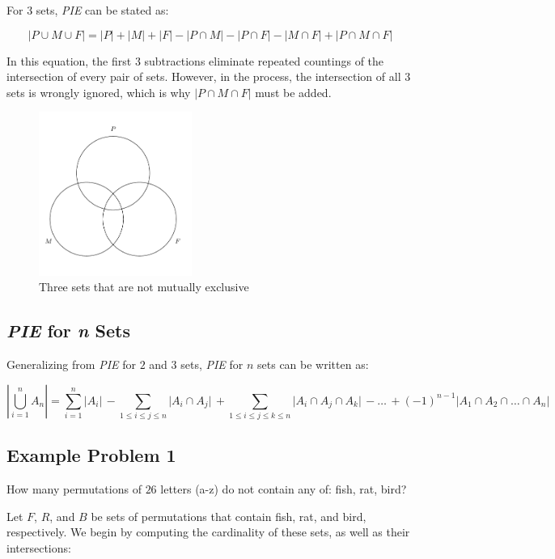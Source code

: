 \documentclass{article}
\begin{document}
For $3$ sets, \textit{PIE} can be stated as:

$$ |P \cup M \cup F| = |P| + |M| + |F| - 
|P \cap M| - |P \cap F| - |M \cap F| 
+ |P \cap M \cap F| $$

In this equation, the first $3$ subtractions eliminate 
repeated countings of the intersection of every pair of sets. 
However, in the process, the intersection of 
all $3$ sets is wrongly ignored, which 
is why $|P \cap M \cap F|$ must be added.

\begin{figure}[h]
\centering
\includegraphics[width=5cm]{VennDiagram3}
\caption{Three sets that are not mutually exclusive}
\end{figure}

\subsection{\textit{PIE} for \textit{n} Sets}

Generalizing from \textit{PIE} for $2$ and $3$ sets, \textit{PIE} for $n$ sets can be written as:

$$
\left\lvert \bigcup_{i=1}^{n} A_{n} \right\rvert ={} 
\sum_{i=1}^{n} \lvert A_{i} \rvert
\, - \sum_{1 \leq i \leq j \leq n} \lvert A_{i} \cap A_{j} \rvert 
\, + \sum_{1 \leq i \leq j \leq k \leq n} \lvert A_{i} \cap A_{j} \cap A_{k} \rvert 
\, - \ldots
\, + (-1)^{n-1} \lvert A_{1} \cap A_{2} \cap \ldots \cap A_{n} \rvert
$$

\subsection{Example Problem 1}
How many permutations of $26$ letters (a-z) do not contain any 
of: fish, rat, bird?

Let $F$, $R$, and $B$ be sets of permutations that contain 
fish, rat, and bird, respectively. We begin by computing the 
cardinality of these sets, as well as their intersections:
\end{document}
